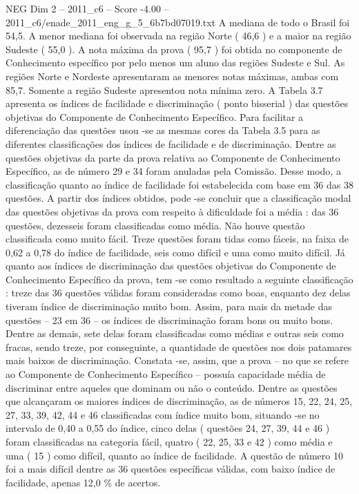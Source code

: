 \begin{textsample}{NEG Dim 2 – 2011\_c6 – Score -4.00 – 2011\_c6/enade\_2011\_eng\_g\_5\_6b7bd07019.txt}
A mediana de todo o Brasil foi 54,5.
A menor mediana foi observada na região Norte ( 46,6 ) e a maior na região Sudeste ( 55,0 ).
A nota máxima da prova ( 95,7 ) foi obtida no componente de Conhecimento específico por pelo menos um aluno das regiões Sudeste e Sul.
As regiões Norte e Nordeste apresentaram as menores notas máximas, ambas com 85,7.
Somente a região Sudeste apresentou nota mínima zero.
A Tabela 3.7 apresenta os índices de facilidade e discriminação ( ponto bisserial ) das questões objetivas do Componente de Conhecimento Específico.
Para facilitar a diferenciação das questões usou -se as mesmas cores da Tabela 3.5 para as diferentes classificações dos índices de facilidade e de discriminação.
Dentre as questões objetivas da parte da prova relativa ao Componente de Conhecimento Específico, as de número 29 e 34 foram anuladas pela Comissão.
Desse modo, a classificação quanto ao índice de facilidade foi estabelecida com base em 36 das 38 questões.
A partir dos índices obtidos, pode -se concluir que a classificação modal das questões objetivas da prova com respeito à dificuldade foi a média : das 36 questões, dezesseis foram classificadas como média.
Não houve questão classificada como muito fácil.
Treze questões foram tidas como fáceis, na faixa de 0,62 a 0,78 do índice de facilidade, seis como difícil e uma como muito difícil.
Já quanto aos índices de discriminação das questões objetivas do Componente de Conhecimento Específico da prova, tem -se como resultado a seguinte classificação : treze das 36 questões válidas foram consideradas como boas, enquanto dez delas tiveram índice de discriminação muito bom.
Assim, para mais da metade das questões – 23 em 36 – os índices de discriminação foram bons ou muito bons.
Dentre as demais, sete delas foram classificadas como médias e outras seis como fracas, sendo treze, por conseguinte, a quantidade de questões nos dois patamares mais baixos de discriminação.
Constata -se, assim, que a prova – no que se refere ao Componente de Conhecimento Específico – possuía capacidade média de discriminar entre aqueles que dominam ou não o conteúdo.
Dentre as questões que alcançaram os maiores índices de discriminação, as de números 15, 22, 24, 25, 27, 33, 39, 42, 44 e 46 classificadas com índice muito bom, situando -se no intervalo de 0,40 a 0,55 do índice, cinco delas ( questões 24, 27, 39, 44 e 46 ) foram classificadas na categoria fácil, quatro ( 22, 25, 33 e 42 ) como média e uma ( 15 ) como difícil, quanto ao índice de facilidade.
A questão de número 10 foi a mais difícil dentre as 36 questões específicas válidas, com baixo índice de facilidade, apenas 12,0 \% de acertos.

\end{textsample}
